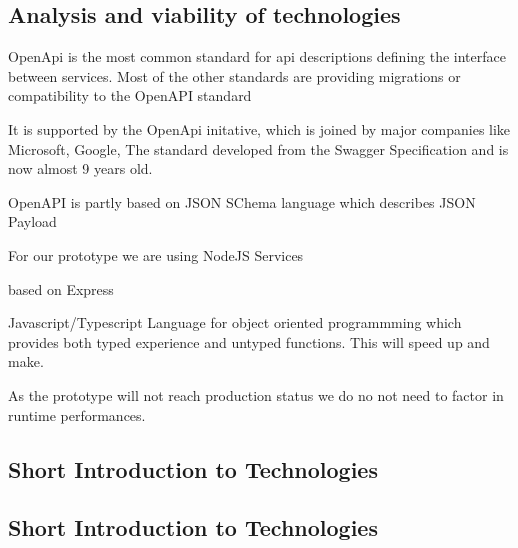 \subsection{Analysis and viability of technologies}



OpenApi is the most common standard for \ac{api} descriptions defining the interface between services. Most of the other standards are providing migrations or compatibility to the OpenAPI standard \cite{Scherer2016DescriptionTransformation} 


It is supported by the OpenApi initative, which is joined by major companies like Microsoft, Google, \cite{TheLinuxFoundation2020CurrentInitiative}
The standard developed from the Swagger Specification and is now almost 9 years old. 

OpenAPI is partly based on JSON SChema language which describes JSON Payload 



For our prototype we are using NodeJS Services

based on Express 

Javascript/Typescript Language for object oriented programmming which provides both typed experience and untyped functions. This will speed up and make. 

As the prototype will not reach production status we do no not need to factor in runtime performances. 

\subsection{Short Introduction to Technologies}





\subsection{Short Introduction to Technologies}



